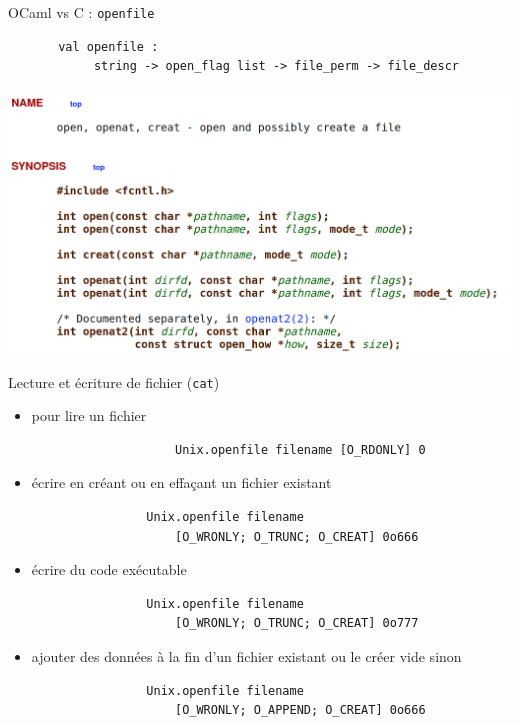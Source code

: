 \begin{frame}[fragile]{OCaml vs C : \texttt{openfile}}
    \begin{lstlisting}
       val openfile : 
            string -> open_flag list -> file_perm -> file_descr
     \end{lstlisting}
    \includegraphics[width=\textwidth]{slides/images/c_api_open.png}
\end{frame}

\begin{frame}[fragile]{Lecture et écriture de fichier (\texttt{cat})}
     \begin{itemize}[label=\small{}]
         \item pour lire un fichier
             \begin{lstlisting}
                    Unix.openfile filename [O_RDONLY] 0
             \end{lstlisting}
         \item écrire en créant ou en effaçant un fichier existant
             \begin{lstlisting}
                Unix.openfile filename 
                    [O_WRONLY; O_TRUNC; O_CREAT] 0o666
            \end{lstlisting}
        \item écrire du code exécutable
             \begin{lstlisting}
                Unix.openfile filename 
                    [O_WRONLY; O_TRUNC; O_CREAT] 0o777
            \end{lstlisting}
        \item ajouter des données à la fin d'un fichier existant ou le créer vide sinon
             \begin{lstlisting}
                Unix.openfile filename 
                    [O_WRONLY; O_APPEND; O_CREAT] 0o666
            \end{lstlisting}
     \end{itemize} 
\end{frame}

